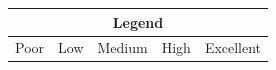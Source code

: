 



\begin{longtable}[c]{lllll}
\label{tab:trade-off_Legend}\\
\multicolumn{5}{c}{\textbf{Legend}} \\
\endfirsthead
%
\endhead
%
\bottomrule
\multicolumn{1}{l|}{\cellcolor[HTML]{FD6864}Poor} &
  \multicolumn{1}{l|}{\cellcolor[HTML]{FCBF7B}Low} &
  \multicolumn{1}{l|}{\cellcolor[HTML]{E0E383}Medium} &
  \multicolumn{1}{l|}{\cellcolor[HTML]{A2D07F}High} &
  \cellcolor[HTML]{63BE7B}Excellent
\\\toprule
\end{longtable}

